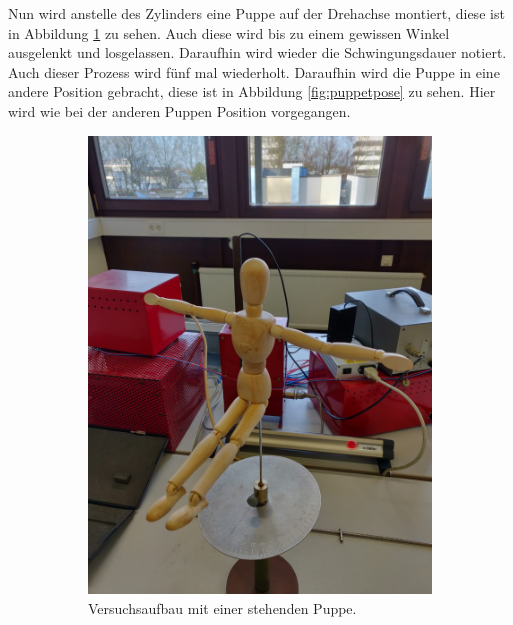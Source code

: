 \FloatBarrier
Nun wird anstelle des Zylinders eine Puppe auf der Drehachse montiert, diese ist in Abbildung \ref{fig:puppesitzend} zu sehen.
Auch diese wird bis zu einem gewissen Winkel ausgelenkt und losgelassen.
Daraufhin wird wieder die Schwingungsdauer notiert.
Auch dieser Prozess wird fünf mal wiederholt.
Daraufhin wird die Puppe in eine andere Position gebracht, diese ist in Abbildung \ref{fig:puppetpose} zu sehen.
Hier wird wie bei der anderen Puppen Position vorgegangen.

\begin{figure}
\centering
\begin{subfigure}{0.5\textwidth}
    \centering
    \includegraphics[scale=0.1]{content/data/PuppeSitzend.png}
    \caption{Versuchsaufbau mit einer stehenden Puppe.}
    \label{fig:puppesitzend}
\end{subfigure}%
\begin{subfigure}{0.5\textwidth}
    \centering

\end{subfigure}
\end{figure}
